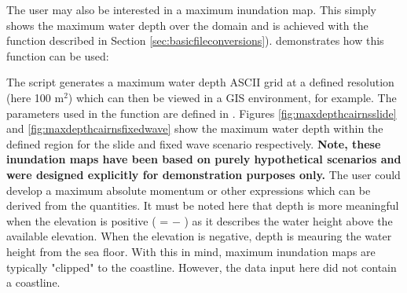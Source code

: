 \documentclass{manual}
\begin{document}
The user may also be interested in a maximum inundation map. This simply shows the
maximum water depth over the domain and is achieved with the function 
described in Section \ref{sec:basicfileconversions}).
 demonstrates how this function can be used:



The script generates a maximum water depth ASCII grid at a defined
resolution (here 100 m$^2$) which can then be viewed in a GIS environment, for
example. The parameters used in the function are defined in .
Figures \ref{fig:maxdepthcairnsslide} and \ref{fig:maxdepthcairnsfixedwave} show
the maximum water depth within the defined region for the slide and fixed wave scenario
respectively. {\bf Note, these inundation maps have been based on purely hypothetical
scenarios and were designed explicitly for demonstration purposes only.}
The user could develop a maximum absolute momentum or other expressions which can be
derived from the quantities.
It must be noted here that depth is more meaningful when the elevation is positive
( =  $-$ ) as it describes the water height
above the available elevation. When the elevation is negative, depth is meauring the
water height from the sea floor. With this in mind, maximum inundation maps are
typically "clipped" to the coastline. However, the data input here did not contain a
coastline.

\clearpage
\end{document}
